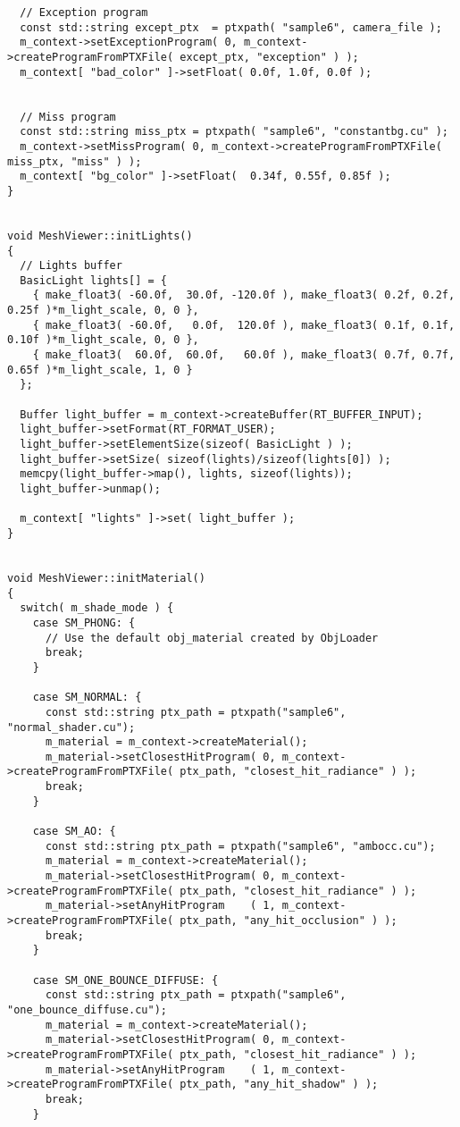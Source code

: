 \begin{verbatim}
  // Exception program
  const std::string except_ptx  = ptxpath( "sample6", camera_file );
  m_context->setExceptionProgram( 0, m_context->createProgramFromPTXFile( except_ptx, "exception" ) );
  m_context[ "bad_color" ]->setFloat( 0.0f, 1.0f, 0.0f );


  // Miss program 
  const std::string miss_ptx = ptxpath( "sample6", "constantbg.cu" );
  m_context->setMissProgram( 0, m_context->createProgramFromPTXFile( miss_ptx, "miss" ) );
  m_context[ "bg_color" ]->setFloat(  0.34f, 0.55f, 0.85f );
}


void MeshViewer::initLights()
{
  // Lights buffer
  BasicLight lights[] = {
    { make_float3( -60.0f,  30.0f, -120.0f ), make_float3( 0.2f, 0.2f, 0.25f )*m_light_scale, 0, 0 },
    { make_float3( -60.0f,   0.0f,  120.0f ), make_float3( 0.1f, 0.1f, 0.10f )*m_light_scale, 0, 0 },
    { make_float3(  60.0f,  60.0f,   60.0f ), make_float3( 0.7f, 0.7f, 0.65f )*m_light_scale, 1, 0 }
  };

  Buffer light_buffer = m_context->createBuffer(RT_BUFFER_INPUT);
  light_buffer->setFormat(RT_FORMAT_USER);
  light_buffer->setElementSize(sizeof( BasicLight ) );
  light_buffer->setSize( sizeof(lights)/sizeof(lights[0]) );
  memcpy(light_buffer->map(), lights, sizeof(lights));
  light_buffer->unmap();

  m_context[ "lights" ]->set( light_buffer );
}


void MeshViewer::initMaterial()
{
  switch( m_shade_mode ) {
    case SM_PHONG: {
      // Use the default obj_material created by ObjLoader
      break;
    }

    case SM_NORMAL: {
      const std::string ptx_path = ptxpath("sample6", "normal_shader.cu");
      m_material = m_context->createMaterial();
      m_material->setClosestHitProgram( 0, m_context->createProgramFromPTXFile( ptx_path, "closest_hit_radiance" ) );
      break;
    }

    case SM_AO: {
      const std::string ptx_path = ptxpath("sample6", "ambocc.cu");
      m_material = m_context->createMaterial();
      m_material->setClosestHitProgram( 0, m_context->createProgramFromPTXFile( ptx_path, "closest_hit_radiance" ) );
      m_material->setAnyHitProgram    ( 1, m_context->createProgramFromPTXFile( ptx_path, "any_hit_occlusion" ) );    
      break;
    } 
    
    case SM_ONE_BOUNCE_DIFFUSE: {
      const std::string ptx_path = ptxpath("sample6", "one_bounce_diffuse.cu");
      m_material = m_context->createMaterial();
      m_material->setClosestHitProgram( 0, m_context->createProgramFromPTXFile( ptx_path, "closest_hit_radiance" ) );
      m_material->setAnyHitProgram    ( 1, m_context->createProgramFromPTXFile( ptx_path, "any_hit_shadow" ) );
      break;
    }


\end{verbatim}
